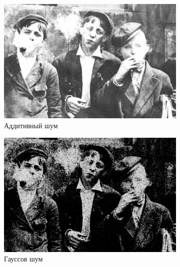 \begin{figure}[ht!]
\begin{subfigure}[b]{0.5\linewidth}
      \includegraphics[width=0.95\linewidth]{../Contraharmonic_Filter/Contraharmonic_Additive_noise_(m,n=(3,_3),q=-0.5).jpg} 
      \caption{Аддитивный шум} 
      \label{contraharmonic_-0.5:c} 
      \vspace{4ex}
    \end{subfigure}%
    \begin{subfigure}[b]{0.5\linewidth}
      \centering
      \includegraphics[width=0.95\linewidth]{../Contraharmonic_Filter/Contraharmonic_Gaussian_noise_(m,n=(3,_3),q=-0.5).jpg} 
      \caption{Гауссов шум} 
      \label{contraharmonic_-0.5:d} 
      \vspace{4ex}
    \end{subfigure}
    \begin{subfigure}[b]{0.5\linewidth}
      \centering

\end{subfigure}
\end{figure}
